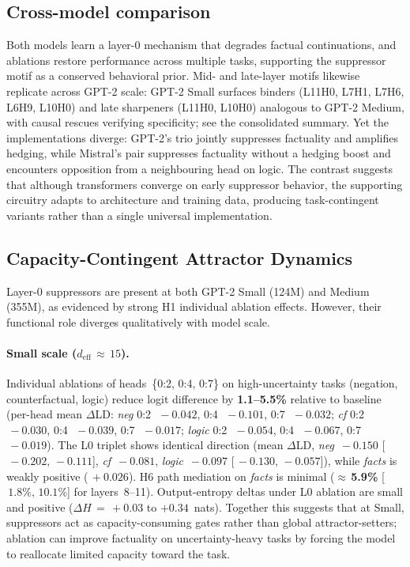 \subsection{Cross-model comparison}
Both models learn a layer-0 mechanism that degrades factual continuations, and ablations restore performance across multiple tasks, supporting the suppressor motif as a conserved behavioral prior.
Mid- and late-layer motifs likewise replicate across GPT-2 scale: GPT-2 Small surfaces binders (L11H0, L7H1, L7H6, L6H9, L10H0) and late sharpeners (L11H0, L10H0) analogous to GPT-2 Medium, with causal rescues verifying specificity; see the consolidated summary.
Yet the implementations diverge: GPT-2’s trio jointly suppresses factuality and amplifies hedging, while Mistral’s pair suppresses factuality without a hedging boost and encounters opposition from a neighbouring head on logic.
The contrast suggests that although transformers converge on early suppressor behavior, the supporting circuitry adapts to architecture and training data, producing task-contingent variants rather than a single universal implementation.

\subsection{Capacity-Contingent Attractor Dynamics}
Layer-0 suppressors are present at both GPT-2 Small (124M) and Medium (355M), as evidenced by strong H1 individual ablation effects. However, their functional role diverges qualitatively with model scale.

\paragraph{Small scale (\texorpdfstring{$d_\text{eff}\,\approx\,15$}{d_eff ≈ 15}).}
Individual ablations of heads~\{0:2, 0:4, 0:7\} on high-uncertainty tasks (negation, counterfactual, logic) reduce logit difference by \textbf{1.1–5.5\%} relative to baseline (per-head mean \(\Delta\)LD: \emph{neg} 0:2~\(\,-0.042\), 0:4~\(\,-0.101\), 0:7~\(\,-0.032\); \emph{cf} 0:2~\(\,-0.030\), 0:4~\(\,-0.039\), 0:7~\(\,-0.017\); \emph{logic} 0:2~\(\,-0.054\), 0:4~\(\,-0.067\), 0:7~\(\,-0.019\)).
The L0 triplet shows identical direction (mean \(\Delta\)LD, \emph{neg} \(\,-0.150\) [\(\,-0.202,\,-0.111\)], \emph{cf} \(\,-0.081\), \emph{logic} \(\,-0.097\) [\(\,-0.130,\,-0.057\)]), while \emph{facts} is weakly positive (\(\,+0.026\)).
H6 path mediation on \emph{facts} is minimal (\(\approx\,\)\textbf{5.9\%} [\(\,1.8\%,\,10.1\%\)] for layers~8–11).
Output-entropy deltas under L0 ablation are small and positive (\(\Delta H\,=\,+0.03\) to \(+0.34\)~nats).
Together this suggests that at Small, suppressors act as capacity-consuming gates rather than global attractor-setters; ablation can improve factuality on uncertainty-heavy tasks by forcing the model to reallocate limited capacity toward the task.

